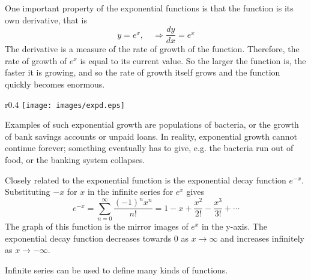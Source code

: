 \documentclass[11pt,a4paper,titlepage,oneside,openany]{article}
\begin{document}
One important property of the exponential functions is that the function is its own derivative, that is
\begin{equation*}
  y=e^x, \quad \Rightarrow \frac{dy}{dx}=e^x
\end{equation*}
The derivative is a measure of the rate of growth of the function. Therefore, the rate of growth of $e^x$ is equal to its current value. So the larger the function is, the faster it is growing, and so the rate of growth itself grows and the function quickly becomes enormous. \begin{wrapfigure}{r}{0.4\textwidth}
    \texttt{[image: images/expd.eps]}
\end{wrapfigure}Examples of such exponential growth are populations of bacteria, or the growth of bank savings accounts or unpaid loans. In reality, exponential growth cannot continue forever; something eventually has to give, e.g. the bacteria run out of food, or the banking system collapses.

Closely related to the exponential function is the exponential decay function $e^{-x}$. Substituting $-x$ for $x$ in the infinite series for $e^x$ gives
\begin{equation*}
  e^{-x} = \sum_{n=0}^{\infty} \frac{(-1)^n x^n}{n!}=1-x+\frac{x^2}{2!}-\frac{x^3}{3!}+\cdots
\end{equation*}
The graph of this function is the mirror images of $e^x$ in the y-axis. The exponential decay function decreases towards $0$ as $x \to \infty$ and increases infinitely as $x \to -\infty$.

Infinite series can be used to define many kinds of functions.
\end{document}
